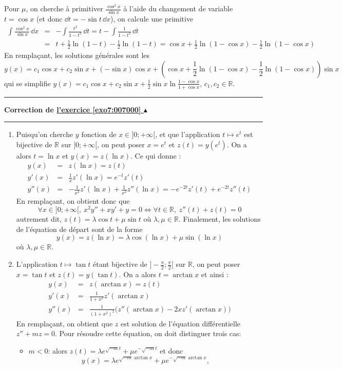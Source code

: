 \documentclass[11pt,a4paper]{article}
\newcommand{\Rr}{\mathbb{R}} \newcommand{\R}{\mathbb{R}}
\newcounter{exo}
\newcommand{\correction}[1]{\hypertarget{cor7:#1}{}\label{cor7:#1}{\bf Correction de \hyperlink{exo7:#1}{l'exercice \ref{exo7:#1} $\blacktriangle$}}\vspace{1mm}\hrule\vspace{1mm}}
\newcommand{\fincorrection}{\vspace{1mm}\hrule\vspace*{7mm}}
\begin{document}
Pour $\mu$, on cherche à primitiver 
$\frac{\cos^2x}{\sin x}$ à l'aide du changement de variable $t=\cos x$ (et donc $\dd t= -\sin t \,\dd x$), 
on calcule une primitive
\begin{eqnarray*}
\int \frac{\cos^2x}{\sin x}\,\dd x&=&-\int\frac{t^2}{1-t^2}\,\dd t=t-\int\frac{1}{1-t^2}\,\dd t\\ 
 &=&t+\frac{1}{2}\ln(1-t) -\frac{1}{2}\ln(1-t)= \cos x + \frac{1}{2}\ln(1-\cos x) - \frac{1}{2}\ln(1-\cos x)
\end{eqnarray*}
En remplaçant, les solutions générales sont les 
$$y(x)=c_1\cos x+c_2\sin x +  (-\sin x)\cos x+\left(\cos x + \frac{1}{2}\ln(1-\cos x) - \frac{1}{2}\ln(1-\cos x)\right)\sin x$$
qui se simplifie $y(x)=c_1\cos x+c_2\sin x + \frac{1}{2}\sin x\ln\frac{1-\cos x}{1+\cos x}$, $c_1,c_2\in\Rr$.
\fincorrection
\correction{007000}
\begin{enumerate}
\item Puisqu'on cherche $y$ fonction de $x\in]0;+\infty[$, et que l'application $t\mapsto e^t$ 
est bijective de $\R$ sur $]0;+\infty[$, on peut poser $x=e^t$ et $z(t)=y(e^t)$. 
On a alors $t= \ln x$ et $y(x) = z(\ln x)$.
Ce qui donne :
\begin{eqnarray*}
y(x)&=&z(\ln x)=z(t)\\
y'(x)&=&\frac{1}{x}z'(\ln x)=e^{-t}z'(t)\\
y''(x)&=&-\frac{1}{x^2}z'(\ln x)+\frac{1}{x^2}z''(\ln x)=-e^{-2t}z'(t)+e^{-2t}z''(t)
\end{eqnarray*}
En remplaçant, on obtient donc que 
$$\forall x\in]0;+\infty[,\ x^2y''+xy'+y=0\Longleftrightarrow\forall t\in\R,\ z''(t)+z(t)=0$$
autrement dit, $z(t)=\lambda\cos t+\mu\sin t$ où $\lambda,\mu\in\R$. 
Finalement, les solutions de l'équation de départ sont de la forme 
$$y(x) = z(\ln x) = \lambda\cos(\ln x)+\mu\sin(\ln x)$$ où $\lambda,\mu\in\R$.

\item L'application $t\mapsto \tan t$ étant bijective de 
$]-\frac{\pi}{2};\frac{\pi}{2}[$ sur $\R$, on peut poser 
$x=\tan t$ et $z(t)=y(\tan t)$. On a alors $t = \arctan x$ et ainsi :
\begin{eqnarray*}
y(x)&=&z(\arctan x)=z(t)\\
y'(x)&=&\frac{1}{1+x^2}z'(\arctan x)\\
y''(x)&=&\frac{1}{(1+x^2)^2}\big(z''(\arctan x)-2xz'(\arctan x)\big)
\end{eqnarray*}
En remplaçant, on obtient que $z$ est solution de l'équation différentielle $z''+mz=0$. Pour résoudre cette équation, on doit distinguer trois cas:
\begin{itemize}
  \item $m<0$: alors $z(t)=\lambda e^{\sqrt{-m}t}+\mu e^{-\sqrt{-m}t}$ et donc  
$$y(x)=\lambda e^{\sqrt{-m}\arctan x}+\mu e^{-\sqrt{-m}\arctan x},$$
  

\end{itemize}
\end{enumerate}
\end{document}
